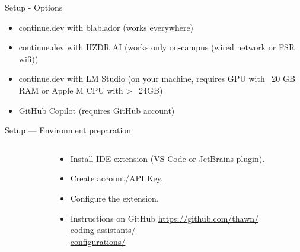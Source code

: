 \documentclass[
  aspectratio=1610,
]{beamer}
\begin{document}
\begin{frame}{Setup - Options}
  \begin{itemize}
    \item continue.dev with blablador (works everywhere)
    \item continue.dev with HZDR AI (works only on-campus (wired network or FSR wifi))
    \item continue.dev with LM Studio (on your machine, requires GPU with ~20 GB RAM or Apple M CPU with >=24GB)
    \item GitHub Copilot (requires GitHub account)
  \end{itemize}
\end{frame}


\begin{frame}{Setup — Environment preparation}
  \begin{columns}[T,totalwidth=\textwidth]
    \begin{column}{0.6\textwidth}
    \end{column}
    \begin{column}{0.37\textwidth}
      \begin{itemize}
        \item Install IDE extension (VS Code or JetBrains plugin).
        \item Create account/API Key.
        \item Configure the extension.
        \item Instructions on GitHub \href{https://github.com/thawn/coding-assistants/configurations/}{https://github.com/thawn/\\coding-assistants/\\configurations/}
      \end{itemize}
    \end{column}
  \end{columns}
\end{frame}
\end{document}
